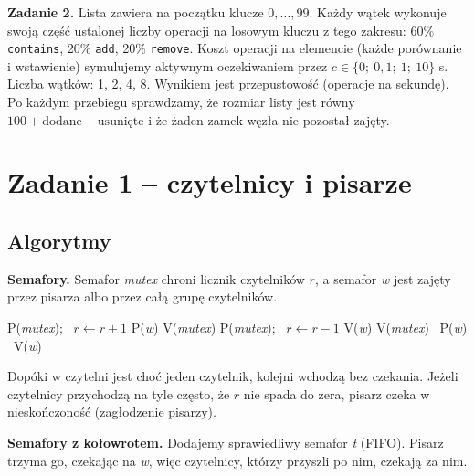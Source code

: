 \documentclass[11pt,a4paper]{article}
\newenvironment{algorytm}[1][htb]
  {\par\bigskip\floatname{algorithm}{}\renewcommand{\thealgorithm}{}
   \begin{algorithm}[#1]%
  }{\end{algorithm}\par\bigskip}
\begin{document}
\textbf{Zadanie 2.} Lista zawiera na początku klucze $0, \dots, 99$. Każdy wątek wykonuje swoją część
ustalonej liczby operacji na losowym kluczu z tego zakresu: 60\% \texttt{contains}, 20\% \texttt{add},
20\% \texttt{remove}. Koszt operacji na elemencie (każde porównanie i wstawienie) symulujemy aktywnym
oczekiwaniem przez $c \in \{0;\ 0{,}1;\ 1;\ 10\}$ \textmu s. Liczba wątków: 1, 2, 4, 8.
Wynikiem jest przepustowość (operacje na sekundę). Po każdym przebiegu sprawdzamy, że rozmiar listy
jest równy $100 + \text{dodane} - \text{usunięte}$ i że żaden zamek węzła nie pozostał zajęty.

\section{Zadanie 1 -- czytelnicy i pisarze}
\subsection{Algorytmy}
\textbf{Semafory.} Semafor \textit{mutex} chroni licznik czytelników $r$, a semafor \textit{w}
jest zajęty przez pisarza albo przez całą grupę czytelników.

\begin{algorytm}[H]
\begin{algorithmic}[1]
        \State \textsc{P}(\textit{mutex}); \ $r \gets r + 1$
         \textsc{P}(\textit{w}) 
        \EndIf
        \State \textsc{V}(\textit{mutex})
    \EndProcedure
        \State \textsc{P}(\textit{mutex}); \ $r \gets r - 1$
         \textsc{V}(\textit{w}) 
        \EndIf
        \State \textsc{V}(\textit{mutex})
    \EndProcedure
     \ \textsc{P}(\textit{w})
    \EndProcedure
     \ \textsc{V}(\textit{w})
    \EndProcedure
\end{algorithmic}
\caption{Czytelnicy i pisarze na semaforach}
\end{algorytm}

Dopóki w czytelni jest choć jeden czytelnik, kolejni wchodzą bez czekania. Jeżeli czytelnicy
przychodzą na tyle często, że $r$ nie spada do zera, pisarz czeka w nieskończoność (zagłodzenie pisarzy).

\textbf{Semafory z kołowrotem.} Dodajemy sprawiedliwy semafor \textit{t} (FIFO).
Pisarz trzyma go, czekając na \textit{w}, więc czytelnicy, którzy przyszli po nim, czekają za nim.
\end{document}
